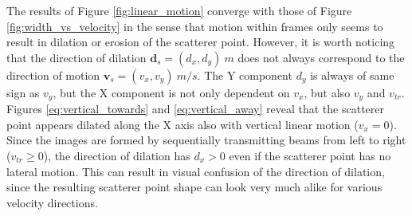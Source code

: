The results of Figure \ref{fig:linear_motion} converge with those of Figure \ref{fig:width_vs_velocity} in the sense that motion within frames only seems to result in dilation or erosion of the scatterer point. However, it is worth noticing that the direction of dilation $\boldsymbol{d}_s = (d_x, d_y)~m$ does not always correspond to the direction of motion $\boldsymbol{v}_s = (v_x, v_y)~m/s$. 
The Y component $d_y$ is always of same sign as $v_y$, but the X component is not only dependent on $v_x$, but also $v_y$ and $v_{tr}$.
Figures \ref{eq:vertical_towards} and \ref{eq:vertical_away} reveal that the scatterer point appears dilated along the X axis also with vertical linear motion ($v_x = 0$). 
Since the images are formed by sequentially transmitting beams from left to right ($v_{tr} \geq 0$), the direction of dilation has $d_x >0$ even if the scatterer point has no lateral motion. This can result in visual confusion of the direction of dilation, since the resulting scatterer point shape can look very much alike for various velocity directions.

